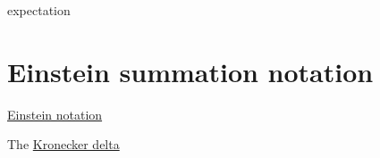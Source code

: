 \documentclass{article}
\begin{document}
expectation


\section{Einstein summation notation}


\href{https://en.wikipedia.org/wiki/Einstein_notation}{Einstein notation}



The \href{https://en.wikipedia.org/wiki/Kronecker_delta}{Kronecker delta}




\end{document}
